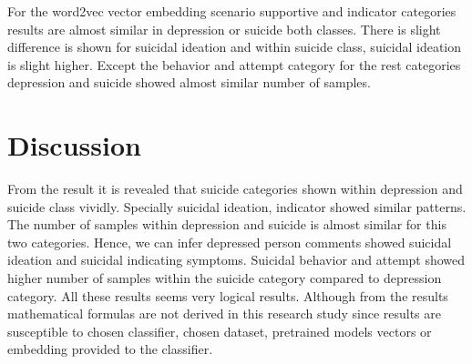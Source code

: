 \documentclass[sn-mathphys,Numbered]{sn-jnl}%
\theoremstyle{thmstyleone}%
\theoremstyle{thmstyletwo}%
\theoremstyle{thmstylethree}%
\begin{document}

For the word2vec vector embedding scenario supportive and indicator categories results are almost similar in depression or suicide both classes. There is slight difference is shown for suicidal ideation and within suicide class, suicidal ideation is slight higher. Except the behavior and attempt category for the rest categories depression and suicide showed almost similar number of samples. 

%        
\section{Discussion} 
From the result it is revealed that suicide categories shown within depression and suicide class vividly. Specially suicidal ideation, indicator showed similar patterns. The number of samples within depression and suicide is almost similar for this two categories. Hence, we can infer depressed person comments showed suicidal ideation and suicidal indicating symptoms. Suicidal behavior and attempt showed higher number of samples within the suicide category compared to depression category. All these results seems very logical results. Although from the results mathematical formulas are not derived in this research study since results are susceptible to chosen classifier, chosen dataset, pretrained models vectors or embedding provided to the classifier. 
 
\end{document}
